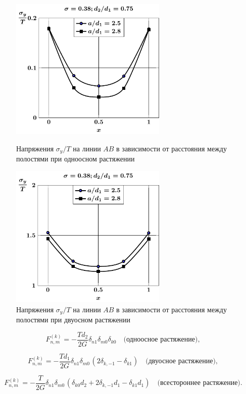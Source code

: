 \begin{figure}[h!]
\centering\footnotesize
\parbox[b]{7.5cm}{\centering\includegraphics[width=7.5cm]{periodic-cav27-a-d75-t1-sig_y.pdf}
\caption{Напряжения $\sigma_y/T$ на линии $AB$ в зависимости от расстояния между полостями при одноосном растяжении
\label{f:11:22}}}\hfil\hfil
\parbox[b]{7.5cm}{\centering\includegraphics[width=7.5cm]{periodic-cav27-a-d75-t2-sig_y.pdf}
\caption{Напряжения $\sigma_y/T$ на линии $AB$ в зависимости от расстояния между полостями при двуосном растяжении
\label{f:11:23}}}
\end{figure}

\begin{equation*}
F_{n,m}^{(k)} =  -\frac{Td_2}{2G}{\delta _{n1}}{\delta _{m0}}{\delta _{k0}}\quad\text{(одноосное растяжение)},
\label{eq:11:19}
\end{equation*}

\begin{equation*}
F_{n,m}^{(k)} =  -\frac{Td_1}{2G}{\delta _{n1}}{\delta _{m0\,}}(2{\delta _{k, - 1}} - {\delta _{k1}})\quad\text{(двуосное растяжение)},
\label{eq:11:20}
\end{equation*}

\begin{equation*}
F_{n,m}^{(k)} =  -\frac{T}{2G}{\delta _{n1}}{\delta _{m0\,}}(\delta_{k0}d_2+2{\delta _{k, - 1}}d_1 - {\delta _{k1}}d_1)\quad\text{(всестороннее растяжение)}.
\label{eq:11:21}
\end{equation*}

